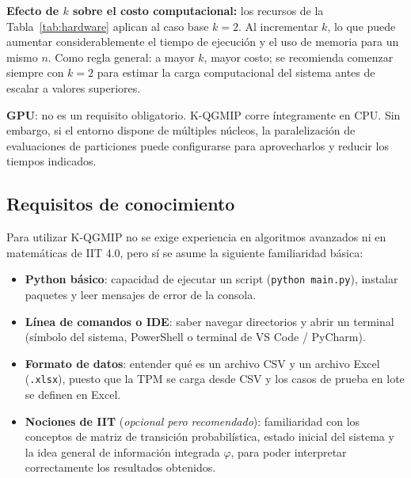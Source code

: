 \textbf{Efecto de $k$ sobre el costo computacional:} los recursos de la
Tabla~\ref{tab:hardware} aplican al caso base $k=2$. Al incrementar $k$, lo
que puede aumentar considerablemente el tiempo de ejecución y el uso de memoria para un
mismo $n$. Como regla general: a mayor $k$, mayor costo; se recomienda comenzar siempre
con $k=2$ para estimar la carga computacional del sistema antes de escalar a valores
superiores.

\textbf{GPU}: no es un requisito obligatorio. K-QGMIP corre íntegramente en CPU. Sin embargo,
si el entorno dispone de múltiples núcleos, la paralelización de evaluaciones de particiones
puede configurarse para aprovecharlos y reducir los tiempos indicados.

\subsection{Requisitos de conocimiento}

Para utilizar K-QGMIP no se exige experiencia en algoritmos avanzados ni en matemáticas de
IIT 4.0, pero sí se asume la siguiente familiaridad básica:

\begin{itemize}
  \item \textbf{Python básico}: capacidad de ejecutar un script (\texttt{python main.py}),
        instalar paquetes y leer mensajes de error de la consola.
  \item \textbf{Línea de comandos o IDE}: saber navegar directorios y abrir un terminal
        (símbolo del sistema, PowerShell o terminal de VS Code / PyCharm).
  \item \textbf{Formato de datos}: entender qué es un archivo CSV y un archivo Excel
        (\texttt{.xlsx}), puesto que la TPM se carga desde CSV y los casos de prueba
        en lote se definen en Excel.
  \item \textbf{Nociones de IIT} (\textit{opcional pero recomendado}): familiaridad con
        los conceptos de matriz de transición probabilística, estado inicial del sistema
        y la idea general de información integrada $\varphi$, para poder interpretar
        correctamente los resultados obtenidos.
\end{itemize}
